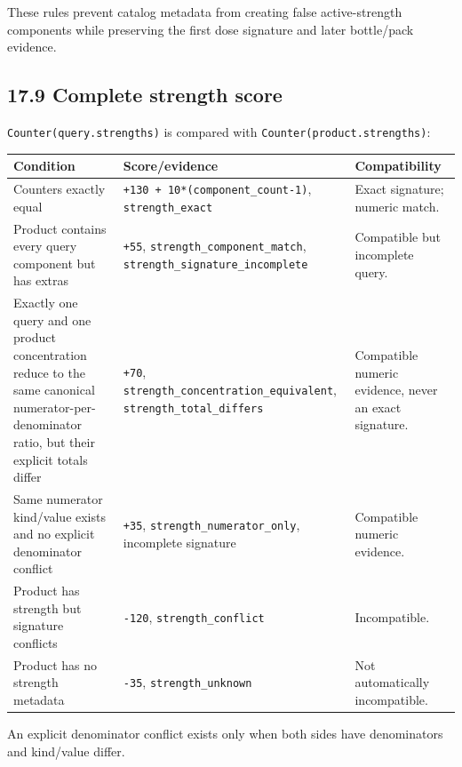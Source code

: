 These rules prevent catalog metadata from creating false active-strength components while preserving the first dose signature and later bottle/pack evidence.

\subsection{17.9 Complete strength score}\label{179-complete-strength-score}

\texttt{Counter(query.strengths)} is compared with \texttt{Counter(product.strengths)}:

{\def\LTcaptype{none} %
\begin{longtable}[]{@{}>{\RaggedRight\arraybackslash}p{.22\linewidth}>{\RaggedRight\arraybackslash}p{.34\linewidth}>{\RaggedRight\arraybackslash}p{.36\linewidth}@{}}
\toprule\noalign{}
Condition & Score/evidence & Compatibility \\
\midrule\noalign{}
\endhead
\bottomrule\noalign{}
\endlastfoot
Counters exactly equal & \texttt{+130\ +\ 10*(component\_\allowbreak{}count-1)}, \texttt{strength\_\allowbreak{}exact} & Exact signature; numeric match. \\
Product contains every query component but has extras & \texttt{+55}, \texttt{strength\_\allowbreak{}component\_\allowbreak{}match}, \texttt{strength\_\allowbreak{}signature\_\allowbreak{}incomplete} & Compatible but incomplete query. \\
Exactly one query and one product concentration reduce to the same canonical numerator-per-denominator ratio, but their explicit totals differ & \texttt{+70}, \texttt{strength\_\allowbreak{}concentration\_\allowbreak{}equivalent}, \texttt{strength\_\allowbreak{}total\_\allowbreak{}differs} & Compatible numeric evidence, never an exact signature. \\
Same numerator kind/value exists and no explicit denominator conflict & \texttt{+35}, \texttt{strength\_\allowbreak{}numerator\_\allowbreak{}only}, incomplete signature & Compatible numeric evidence. \\
Product has strength but signature conflicts & \texttt{-120}, \texttt{strength\_\allowbreak{}conflict} & Incompatible. \\
Product has no strength metadata & \texttt{-35}, \texttt{strength\_\allowbreak{}unknown} & Not automatically incompatible. \\
\end{longtable}
}

An explicit denominator conflict exists only when both sides have denominators and kind/value differ.

